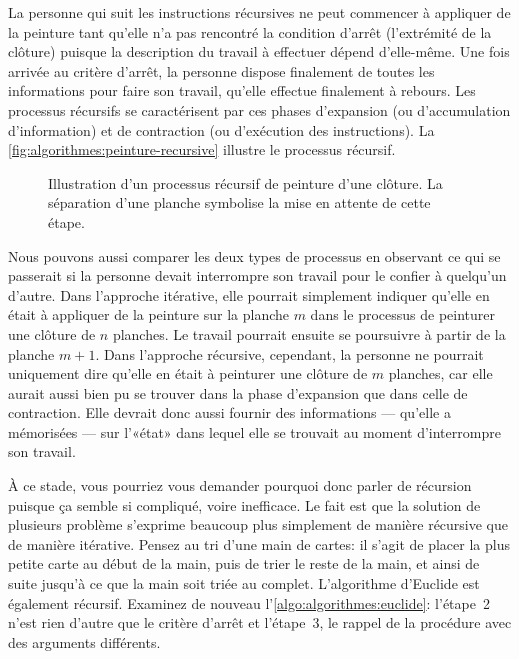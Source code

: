 La personne qui suit les instructions récursives ne peut commencer à
appliquer de la peinture tant qu'elle n'a pas rencontré la condition
d'arrêt (l'extrémité de la clôture) puisque la description du travail
à effectuer dépend d'elle-même. Une fois arrivée au critère d'arrêt,
la personne dispose finalement de toutes les informations pour faire
son travail, qu'elle effectue finalement à rebours. Les processus
récursifs se caractérisent par ces phases d'expansion
(ou d'accumulation d'information) et de contraction
(ou d'exécution des instructions). La
\autoref{fig:algorithmes:peinture-recursive} illustre le processus
récursif.

\begin{figure}
  \centering
  \setlength{\unitlength}{0.99mm}
  
  
  \caption[Illustration d'un processus récursif de peinture d'une
  clôture]{Illustration d'un processus récursif de peinture d'une
    clôture. La séparation d'une planche symbolise la mise en attente
    de cette étape.}
  \label{fig:algorithmes:peinture-recursive}
\end{figure}

Nous pouvons aussi comparer les deux types de processus en observant
ce qui se passerait si la personne devait interrompre son travail pour
le confier à quelqu'un d'autre. Dans l'approche itérative, elle
pourrait simplement indiquer qu'elle en était à appliquer de la
peinture sur la planche $m$ dans le processus de peinturer une clôture
de $n$ planches. Le travail pourrait ensuite se poursuivre à partir de
la planche $m + 1$. Dans l'approche récursive, cependant, la personne
ne pourrait uniquement dire qu'elle en était à peinturer une clôture
de $m$ planches, car elle aurait aussi bien pu se trouver dans la
phase d'expansion que dans celle de contraction. Elle devrait donc
aussi fournir des informations --- qu'elle a mémorisées --- sur
l'«état» dans lequel elle se trouvait au moment d'interrompre son
travail.

À ce stade, vous pourriez vous demander pourquoi donc parler de
récursion puisque ça semble si compliqué,
voire inefficace. Le fait est que la solution de plusieurs problème
s'exprime beaucoup plus simplement de manière récursive que de manière
itérative. Pensez au tri d'une main de cartes: il s'agit de placer la
plus petite carte au début de la main, puis de trier le reste de la
main, et ainsi de suite jusqu'à ce que la main soit triée au complet.
L'algorithme d'Euclide est
également récursif. Examinez de nouveau
l'\autoref{algo:algorithmes:euclide}: l'étape~2 n'est rien d'autre que
le critère d'arrêt et l'étape~3, le rappel de la procédure avec des
arguments différents.


